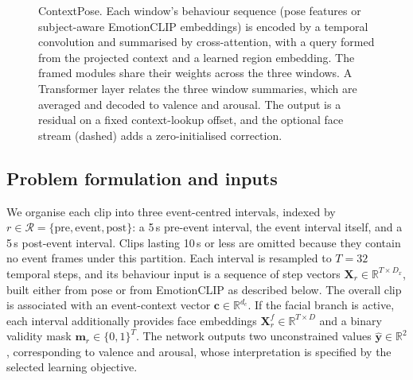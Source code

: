 \documentclass[11pt]{article}
\newcommand{\R}{\mathbb{R}}
\newcommand{\regions}{\mathcal{R}}
\newcommand{\vc}{\mathbf{c}}
\newcommand{\vy}{\hat{\mathbf{y}}}
\newcommand{\vu}{\mathbf{u}}
\newcommand{\mX}{\mathbf{X}}
\begin{document}
\begin{figure}[t]
\caption{ContextPose. Each window's behaviour sequence (pose features or subject-aware EmotionCLIP embeddings) is encoded by a temporal convolution and summarised by cross-attention, with a query formed from the projected context and a learned region embedding. The framed modules share their weights across the three windows. A Transformer layer relates the three window summaries, which are averaged and decoded to valence and arousal. The output is a residual on a fixed context-lookup offset, and the optional face stream (dashed) adds a zero-initialised correction.}
\label{fig:arch}
\end{figure}

\subsection{Problem formulation and inputs}
\label{sec:inputs}

We organise each clip into three event-centred intervals, indexed by $r\in\regions=\{\text{pre},\text{event},\text{post}\}$: a 5\,s pre-event interval, the event interval itself, and a 5\,s post-event interval. Clips lasting 10\,s or less are omitted because they contain no event frames under this partition. Each interval is resampled to $T=32$ temporal steps, and its behaviour input is a sequence of step vectors $\mX_r\in\R^{T\times D_x}$, built either from pose or from EmotionCLIP as described below. The overall clip is associated with an event-context vector $\vc\in\R^{d_c}$. If the facial branch is active, each interval additionally provides face embeddings $\mathbf{X}^f_r\in\R^{T\times D}$ and a binary validity mask $\mathbf{m}_r\in\{0,1\}^{T}$. The network outputs two unconstrained values $\vy\in\R^2$, corresponding to valence and arousal, whose interpretation is specified by the selected learning objective.
\end{document}
